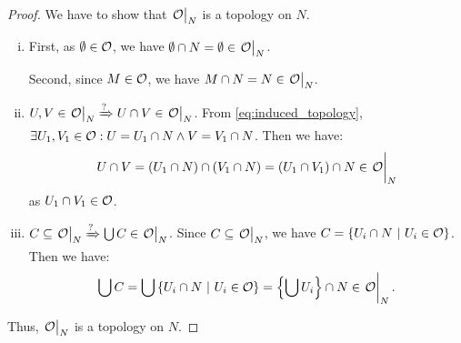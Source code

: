 \begin{proof}
	We have to show that \(\eval{\O}_N\) is a topology on \(N\).
	\begin{enumerate}[(i)]
		\item First, as \(\emptyset \in \mathcal{O}\), we have \(\0 \cap N = \0 \in \eval{\O}_N\).

		      Second, since \(M \in \mathcal{O}\), we have \(M \cap N = N \in \eval{\O}_N\).

		\item \(U, V \in \eval{\O}_N \xRightarrow{?} U \cap V \in \eval{\O}_N\). From \eqref{eq:induced_topology}, \(\exists U_1, V_1 \in \mathcal{O}: U = U_1 \cap N \land V = V_1 \cap N\). Then we have:
		      \begin{equation*}
			      U \cap V = (U_1 \cap N) \cap (V_1 \cap N) = (U_1 \cap V_1) \cap N \in \eval{\O}_N
		      \end{equation*}
		      as \(U_1 \cap V_1 \in \mathcal{O}\).

		\item \(C \subseteq \eval{\O}_N \xRightarrow{?} \bigcup C\in\eval{\O}_N\). Since \(C \subseteq \eval{\O}_N\), we have \(C = \qty{U_i \cap N \ \middle|\ U_i \in \mathcal{O}}\). Then we have:
		      \begin{equation*}
			      \bigcup C = \bigcup \qty{U_i \cap N \mid U_i \in \O} = \qty{\bigcup U_i} \cap N \in \eval{\O}_N.
		      \end{equation*}
	\end{enumerate}
	Thus, \(\eval{\O}_N\) is a topology on \(N\).
\end{proof}

